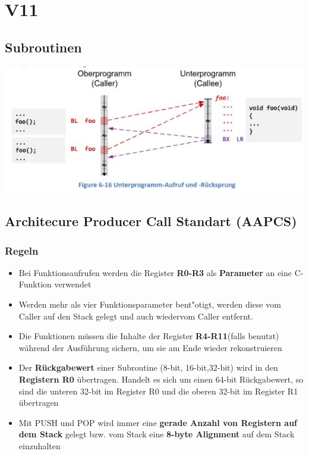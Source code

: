 \section{V11}
\subsection{Subroutinen}
\includegraphics[11cm]{images/subroutinen} 

\subsection{Architecure Producer Call Standart (AAPCS)}
\subsubsection{Regeln}
\begin{itemize}
    \item Bei Funktionsaufrufen werden die Register \textbf{R0-R3} als \textbf{Parameter} an eine C-Funktion verwendet
    \item Werden mehr als vier Funktionsparameter bent"otigt, werden diese vom Caller auf den Stack gelegt und auch wiedervom Caller entfernt.
    \item Die Funktionen müssen die Inhalte der Register \textbf{R4-R11}(falls benutzt) während der Ausführung sichern, um sie am Ende wieder rekonstruieren
    \item Der \textbf{Rückgabewert} einer Subroutine (8-bit, 16-bit,32-bit) wird in den \textbf{Registern R0} übertragen. Handelt es sich um einen 64-bit Rückgabewert, so sind die unteren 32-bit im Register R0 und die oberen 32-bit im Register R1 übertragen
    \item Mit PUSH und POP wird immer eine \textbf{gerade Anzahl von Registern auf dem Stack} gelegt bzw. vom Stack eine \textbf{8-byte Alignment} auf dem Stack einzuhalten
\end{itemize}

